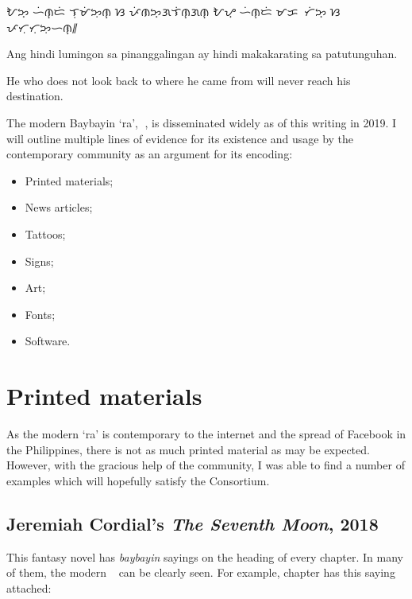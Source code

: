 \documentclass[a4paper,pagesize,openany,14pt,parskip=never]{scrbook}
\newcommand{\≈}{$\approx$}
\newcommand{\ra}{{\baybayin ᜍ}}
\begin{document}
    {\baybayin ᜀᜅ᜔ ᜑᜒᜈ᜔ᜇᜒ ᜎᜓᜋᜒᜅᜓᜈ᜔ ᜐ ᜉᜒᜈᜅ᜔ᜄᜎᜒᜈ᜔ᜄᜈ᜔ ᜀᜌ᜔ ᜑᜒᜈ᜔ᜇᜒ ᜋᜃᜍᜍᜆᜒᜅ᜔ ᜐ ᜉᜆᜓᜆᜓᜅᜓᜑᜈ᜔᜶}

    Ang hindi lumingon sa pinanggalingan ay hindi makakarating sa patutunguhan.

    He who does not look back to where he came from will never reach his destination.

\newpage
{}
The modern Baybayin `ra', {\baybayin ᜍ}, is disseminated widely as of this writing in 2019. I will outline multiple lines of evidence for its existence and usage by the contemporary community as an argument for its encoding:

\begin{itemize}
    \item Printed materials;
    \item News articles;
    \item Tattoos;
    \item Signs;
    \item Art;
    \item Fonts;
    \item Software.
\end{itemize}

\section{Printed materials}

As the modern `ra' is contemporary to the internet and the spread of Facebook in the Philippines, there is not as much printed material as may be expected. However, with the gracious help of the community, I was able to find a number of examples which will hopefully satisfy the Consortium.

\subsection{Jeremiah Cordial's {\em The Seventh Moon}, 2018}

This fantasy novel has {\em baybayin} sayings on the heading of every chapter. In many of them, the modern \ra\ can be clearly seen. For example, chapter  has this saying attached:
\end{document}
